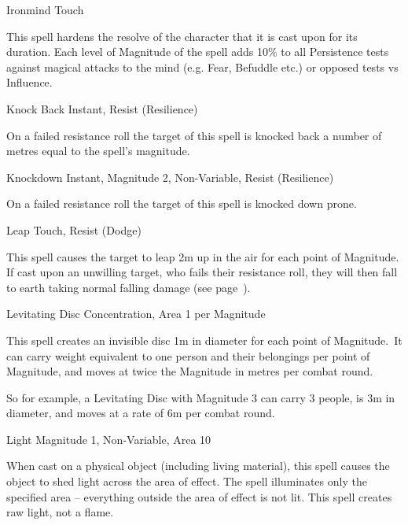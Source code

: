 \begin{rpg-spell}
{Ironmind}
{Touch}

This spell hardens the resolve of the character that it is cast upon for its duration. Each level of Magnitude of the spell adds 10\% to all Persistence tests against magical attacks to the mind (e.g. Fear, Befuddle etc.) or opposed tests vs Influence.
\end{rpg-spell}


\begin{rpg-spell}
{Knock Back}
{Instant, Resist (Resilience)}

On a failed resistance roll the target of this spell is knocked back a number of metres equal to the spell’s magnitude.
\end{rpg-spell}


\begin{rpg-spell}
{Knockdown}
{Instant, Magnitude 2, Non-Variable, Resist (Resilience)}

On a failed resistance roll the target of this spell is knocked down prone.
\end{rpg-spell}


\begin{rpg-spell}
{Leap}
{Touch, Resist (Dodge)}

This spell causes the target to leap 2m up in the air for each point of Magnitude. If cast upon an unwilling target, who fails their resistance roll, they will then fall to earth taking normal falling damage (see page~\pageref{ssec:falling}).
\end{rpg-spell}


\begin{rpg-spell}
{Levitating Disc}
{Concentration, Area 1 per Magnitude}

This spell creates an invisible disc 1m in diameter for each point of Magnitude. It can carry weight equivalent to one person and their belongings per point of Magnitude, and moves at twice the Magnitude in metres per combat round.

So for example, a Levitating Disc with Magnitude 3 can carry 3 people, is 3m in diameter, and moves at a rate of 6m per combat round.
\end{rpg-spell}


\begin{rpg-spell}
{Light}
{Magnitude 1, Non-Variable, Area 10}

When cast on a physical object (including living material), this spell causes the object to shed light across the area of effect. The spell illuminates only the specified area – everything outside the area of effect is not lit. This spell creates raw light, not a flame.
\end{rpg-spell}


